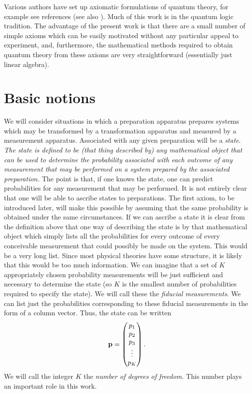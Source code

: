 \documentclass[12pt]{article}
\begin{document}
Various authors have set up axiomatic formulations of quantum
theory, for example see references
\cite{birkoff,mackey,piron,ludwig,mielnik,lande,fivel,accardi,landsman,cmw}
(see
also \cite{gleason,kochen,pitowsky}). Much of this work is in the quantum logic
tradition.  The advantage of the present work is that there
are a small number of simple axioms which can be easily
motivated without any particular appeal to experiment,
and, furthermore, the mathematical methods required to obtain quantum
theory from
these axioms are very straightforward (essentially just linear algebra).


\section{Basic notions}\label{basicnotions}

We will consider
situations in which a preparation apparatus prepares systems which may
be transformed by a transformation apparatus and measured by a
measurement apparatus.  Associated with any given preparation will be a
{\it state}.  {\it The state is defined to be (that thing described by) any
mathematical object that can be used to determine the probability
associated with each outcome of any measurement that may be performed on
a system prepared by the associated preparation.} The point is that, if
one knows the state, one can predict probabilities for any
measurement that may be performed.  It is not entirely
clear that one will be able to ascribe states to preparations. The first
axiom, to be introduced later, will make this possible by assuming that
the same probability is obtained under the same circumstances.  If we
can ascribe a state it is clear from the definition above that one way
of describing the state is by that
mathematical object which simply lists all the probabilities for every
outcome of every conceivable measurement that could possibly be made on
the system.  This would be a very long list. Since most
physical theories have some structure, it is likely that this would be
too much information.  We can imagine that a set of $K$ appropriately chosen
probability measurements will be just sufficient and necessary to
determine the state (so $K$ is the smallest number of probabilities
required to specify the state). We will call these the
{\it fiducial measurements}.
We can list just the probabilities corresponding to these fiducial
measurements in the form of a column vector. Thus, the state can be written
\begin{equation}
  {\bf p} = \left(
  \begin{matrix} p_1 \\ p_2 \\ p_3 \\ \vdots \\ p_K \end{matrix}
  \right).
\end{equation}
We will call the integer $K$ the {\it number of degrees of freedom}. This
number plays an important role in this work.
\end{document}
